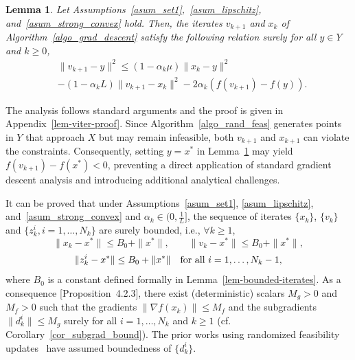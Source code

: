 \documentclass{article}
\def\a{\alpha}
\newcommand{\colr}[1]{\textcolor{red}{#1}} %
\theoremstyle{plain}
\newtheorem{lemma}[theorem]{Lemma}
\theoremstyle{definition}
\theoremstyle{remark}
\begin{document}




%
%
\begin{lemma}\label{lem-viter}
     Let Assumptions~\ref{asum_set1},~\ref{asum_lipschitz}, and~\ref{asum_strong_convex} hold.
     Then, the iterates $v_{k+1}$ and $x_k$ of Algorithm~\ref{algo_grad_descent} satisfy the following relation surely for all $y\in Y$ and $k\ge0$,
     \begin{align*}
         &\|v_{k+1} - y\|^2 \leq (1-\a_k \mu) \| x_{k} -y \|^2 \\
         &- (1 - \a_k L) \| v_{k+1} - x_{k} \|^2 - 2 \a_k (f(v_{k+1}) - f(y)).
     \end{align*}
\end{lemma}
%
%
The analysis follows standard arguments and the proof is given in Appendix~\ref{lem-viter-proof}. Since Algorithm~\ref{algo_rand_feas} generates points in $Y$ that approach $X$ but may remain infeasible, both $v_{k+1}$ and $x_{k+1}$ can violate the constraints. Consequently, setting $y = x^*$ in Lemma~\ref{lem-viter} may yield $f(v_{k+1}) - f(x^*) < 0$, preventing a direct application of standard gradient descent analysis and introducing additional analytical challenges.

It can be proved that under Assumptions~\ref{asum_set1}, \ref{asum_lipschitz}, and~\ref{asum_strong_convex} and $\a_k \in (0,\tfrac{1}{L}]$, the sequence of iterates $\{x_k\}$, $\{v_k\}$ and $\{z_k^i, i=1,\ldots,N_k\}$ are surely bounded, i.e., $\forall k \geq 1$,
\[\|x_k-x^*\|\le B_0+\|x^*\|, \qquad \|v_k-x^*\|\le B_0+\|x^*\|,\]
\[\|z_{k}^i-x^*\|\le B_0+\|x^*\| \quad \hbox{for all $i=1,\ldots,N_k-1$},\]
where $B_0$ is a constant defined formally in Lemma~\ref{lem-bounded-iterates}. As a consequence \cite{bertsekas2003convex}[Proposition~4.2.3], there exist (deterministic) scalars $M_g>0$ and $M_f>0$ such that the gradients $\|\nabla f(x_k)\| \leq M_f$ and the subgradients $\|d_k^i\| \leq M_g$ surely for all $i=1,\ldots,N_k$ and $k\ge 1$ (cf. Corollary~\ref{cor_subgrad_bound}). The prior works using randomized feasibility updates~\cite{nedic2019random, singh2024stochastic, singh2024mini, singh2024unified, necoara2022stochastic} have assumed boundedness of $\{d_k^i\}$.
\end{document}
